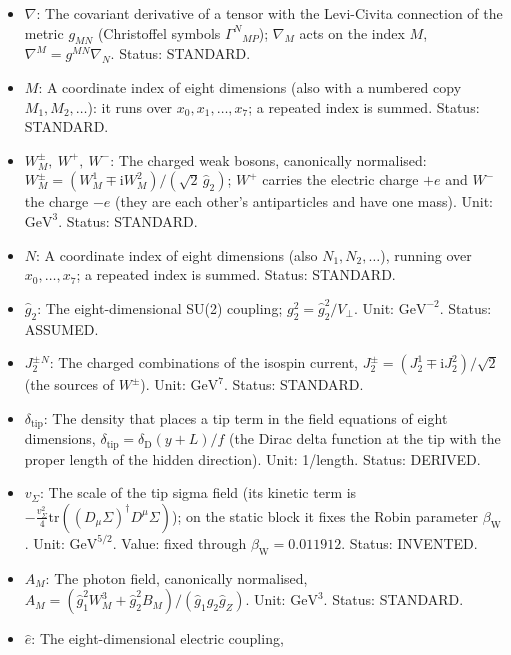 \documentclass[
  10pt,
]{article}
\providecommand{\tightlist}{%
  \setlength{\itemsep}{0pt}\setlength{\parskip}{0pt}}
\begin{document}
\begin{itemize}
\tightlist
\item
  \(\nabla\): The covariant derivative of a tensor with the Levi-Civita
  connection of the metric \(g_{MN}\) (Christoffel symbols
  \(\Gamma^N{}_{MP}\)); \(\nabla_M\) acts on the index \(M\),
  \(\nabla^M = g^{MN}\nabla_N\). Status: STANDARD.
\item
  \(M\): A coordinate index of eight dimensions (also with a numbered
  copy \(M_1, M_2, \dots\)): it runs over \(x_0, x_1, \dots, x_7\); a
  repeated index is summed. Status: STANDARD.
\item
  \(W^\pm_M,\ W^+,\ W^-\): The charged weak bosons, canonically
  normalised:
  \(W^\pm_M = (W^1_M \mp \mathrm{i}W^2_M)/(\sqrt2\,\hat g_2)\); \(W^+\)
  carries the electric charge \(+e\) and \(W^-\) the charge \(-e\) (they
  are each other's antiparticles and have one mass). Unit:
  \(\mathrm{GeV}^{3}\). Status: STANDARD.
\item
  \(N\): A coordinate index of eight dimensions (also
  \(N_1, N_2, \dots\)), running over \(x_0, \dots, x_7\); a repeated
  index is summed. Status: STANDARD.
\item
  \(\hat g_2\): The eight-dimensional SU(2) coupling;
  \(g_2^2 = \hat g_2^2/V_\perp\). Unit: \(\mathrm{GeV}^{-2}\). Status:
  ASSUMED.
\item
  \(J_2^{\pm}{}^N\): The charged combinations of the isospin current,
  \(J_2^\pm = (J_2^1 \mp \mathrm{i}J_2^2)/\sqrt2\) (the sources of
  \(W^\pm\)). Unit: \(\mathrm{GeV}^{7}\). Status: STANDARD.
\item
  \(\delta_{\mathrm{tip}}\): The density that places a tip term in the
  field equations of eight dimensions,
  \(\delta_{\mathrm{tip}} = \delta_{\mathrm{D}}(y + L)/f\) (the Dirac
  delta function at the tip with the proper length of the hidden
  direction). Unit: 1/length. Status: DERIVED.
\item
  \(v_\Sigma\): The scale of the tip sigma field (its kinetic term is
  \(-\frac{v_\Sigma^2}{4}\mathrm{tr}((D_\mu\Sigma)^\dagger D^\mu\Sigma)\));
  on the static block it fixes the Robin parameter
  \(\beta_{\mathrm{W}}\). Unit: \(\mathrm{GeV}^{5/2}\). Value: fixed
  through \(\beta_{\mathrm{W}} = 0.011912\). Status: INVENTED.
\item
  \(A_M\): The photon field, canonically normalised,
  \(A_M = (\hat g_1^2W^3_M + \hat g_2^2B_M)/(\hat g_1\hat g_2\hat g_Z)\).
  Unit: \(\mathrm{GeV}^{3}\). Status: STANDARD.
\item
  \(\hat e\): The eight-dimensional electric coupling,

\end{itemize}
\end{document}
